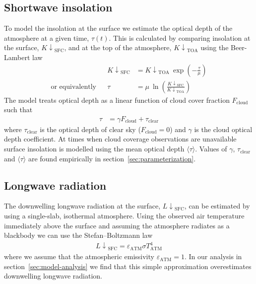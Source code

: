 \documentclass[a4paper,titlepage, twoside]{report}
\newcommand\Kdownsfc{{K\!\!\downarrow}_\mathrm{SFC}}
\newcommand\Kdowntoa{{K\!\!\downarrow}_\mathrm{TOA}}
\newcommand\Ldownsfc{{L\!\!\downarrow}_\mathrm{SFC}}
\begin{document}
\subsection{Shortwave insolation}
To model the insolation at the surface we estimate the optical depth of the atmosphere at a given time, $\tau(t)$.  This is calculated by comparing insolation at the surface, $\Kdownsfc$, and at the top of the atmosphere, $\Kdowntoa$ using the Beer-Lambert law \parencite{stephens}
\begin{align}
&& \Kdownsfc &= \Kdowntoa\: \exp \left( -\frac{\tau}{\mu} \right) \\
\text{or equivalently} && \tau &= \mu \: \ln \left( \frac{\Kdownsfc}{\Kdowntoa} \right)
\end{align}
The model treats optical depth as a linear function of cloud cover fraction $F_\mathrm{cloud}$ such that 
\begin{align}
\tau &= \gamma F_\mathrm{cloud} + \tau_\mathrm{clear} \label{eq:linear-sw-cloud}
\end{align}
where $\tau_\mathrm{clear}$ is the optical depth of clear sky ($F_\mathrm{cloud} = 0$) and $\gamma$ is the cloud optical depth coefficient.  At times when cloud coverage observations are unavailable surface insolation is modelled using the mean optical depth $\langle \tau \rangle$.  Values of $\gamma$, $\tau_\mathrm{clear}$ and $\langle \tau \rangle$ are found empirically in section~\ref{sec:parameterization}.

\subsection{Longwave radiation}
The downwelling longwave radiation at the surface, $\Ldownsfc$, can be estimated by using a single-slab, isothermal atmosphere.  Using the observed air temperature immediately above the surface and assuming the atmosphere radiates as a blackbody we can use the Stefan--Boltzmann law \parencite[p. 168]{ambaum}
\begin{align}
\Ldownsfc = \varepsilon_\mathrm{ATM} \sigma T_\mathrm{ATM}^4 \label{eq:stefan-boltzmann}
\end{align}
where we assume that the atmospheric emissivity $\varepsilon_\mathrm{ATM} = 1$.  In our analysis in section~\ref{sec:model-analysis} we find that this simple approximation overestimates downwelling longwave radiation.
\end{document}
